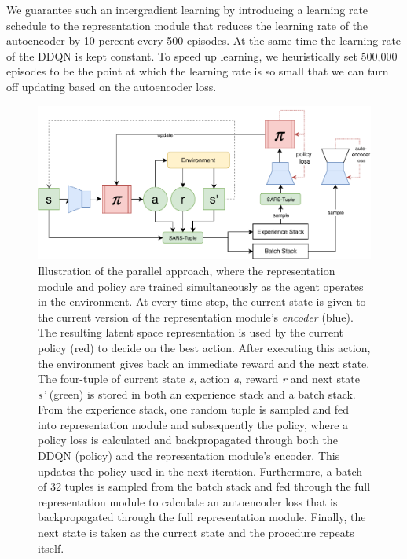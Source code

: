 We guarantee such an intergradient learning by introducing a learning rate schedule to the representation module that reduces the learning rate of the autoencoder by 10 percent every 500 episodes. At the same time the learning rate of the DDQN is kept constant. To speed up learning, we heuristically set 500,000 episodes to be the point at which the learning rate is so small that we can turn off updating based on the autoencoder loss. 

\begin{figure}[ht]
	\centering
	\includegraphics[width=\textwidth]{img/full-model.pdf}
	\caption{Illustration of the parallel approach, where the representation module and policy are trained simultaneously as the agent operates in the environment. At every time step, the current state is given to the current version of the representation module's \textit{encoder} (blue). The resulting latent space representation is used by the current policy (red) to decide on the best action. After executing this action, the environment gives back an immediate reward and the next state. The four-tuple of current state \textit{s}, action \textit{a}, reward \textit{r} and next state \textit{s'} (green) is stored in both an experience stack and a batch stack. From the experience stack, one random tuple is sampled and fed into representation module and subsequently the policy, where a policy loss is calculated and backpropagated through both the DDQN (policy) and the representation module's encoder. This updates the policy used in the next iteration. Furthermore, a batch of 32 tuples is sampled from the batch stack and fed through the full representation module to calculate an autoencoder loss that is backpropagated through the full representation module. Finally, the next state is taken as the current state and the procedure repeats itself. \label{fig:approaches}}
\end{figure}